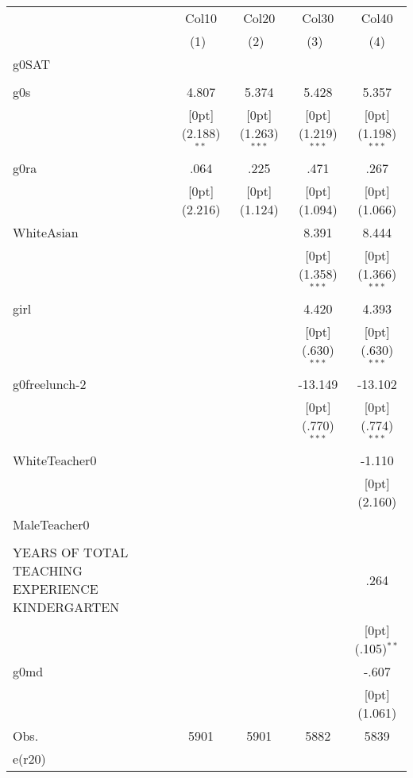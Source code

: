 \documentclass[a4paper,11pt]{article}
\begin{document}
\setlength\tabcolsep{1.75pt} 
\begin{table}
\begin{tabular*}{\textwidth}{@{\extracolsep{\fill}}lcccc}				
	& \multicolumn{1}{c}{Col10} &	\multicolumn{1}{c}{Col20} &	\multicolumn{1}{c}{Col30} &	\multicolumn{1}{c}{Col40} \\
	\cline{2-5}				
	& \multicolumn{1}{c}{(1)\mbox{\ }} &	\multicolumn{1}{c}{(2)\mbox{\ }} &	\multicolumn{1}{c}{(3)\mbox{\ }} &	\multicolumn{1}{c}{(4)} \\
	\hline				
	g0SAT &	&	&	&	\\
	&	&	&	&	\\
	g0s &	4.807 &	5.374 &	5.428 &	5.357 \\
	&	\raisebox{.7ex}[0pt]{\scriptsize (2.188)$^{**}$} &	\raisebox{.7ex}[0pt]{\scriptsize (1.263)$^{***}$} &	\raisebox{.7ex}[0pt]{\scriptsize (1.219)$^{***}$} &	\raisebox{.7ex}[0pt]{\scriptsize (1.198)$^{***}$} \\
	g0ra &	.064 &	.225 &	.471 &	.267 \\
	&	\raisebox{.7ex}[0pt]{\scriptsize (2.216)} &	\raisebox{.7ex}[0pt]{\scriptsize (1.124)} &	\raisebox{.7ex}[0pt]{\scriptsize (1.094)} &	\raisebox{.7ex}[0pt]{\scriptsize (1.066)} \\
	WhiteAsian &	&	&	8.391 &	8.444 \\
	&	&	&	\raisebox{.7ex}[0pt]{\scriptsize (1.358)$^{***}$} &	\raisebox{.7ex}[0pt]{\scriptsize (1.366)$^{***}$} \\
	girl &	&	&	4.420 &	4.393 \\
	&	&	&	\raisebox{.7ex}[0pt]{\scriptsize (.630)$^{***}$} &	\raisebox{.7ex}[0pt]{\scriptsize (.630)$^{***}$} \\
	g0freelunch-2 &	&	&	-13.149 &	-13.102 \\
	&	&	&	\raisebox{.7ex}[0pt]{\scriptsize (.770)$^{***}$} &	\raisebox{.7ex}[0pt]{\scriptsize (.774)$^{***}$} \\
	WhiteTeacher0 &	&	&	&	-1.110 \\
	&	&	&	&	\raisebox{.7ex}[0pt]{\scriptsize (2.160)} \\
	MaleTeacher0 &	&	&	&	\\
	&	&	&	&	\\
	YEARS OF TOTAL TEACHING EXPERIENCE KINDERGARTEN &	&	&	&	.264 \\
	&	&	&	&	\raisebox{.7ex}[0pt]{\scriptsize (.105)$^{**}$} \\
	g0md &	&	&	&	-.607 \\
	&	&	&	&	\raisebox{.7ex}[0pt]{\scriptsize (1.061)} \\
	Obs. &	5901 &	5901 &	5882 &	5839 \\
	e(r20) &	&	&	&	\\
	\hline\hline				
\end{tabular*}		

\end{table}	
	
\end{document}
